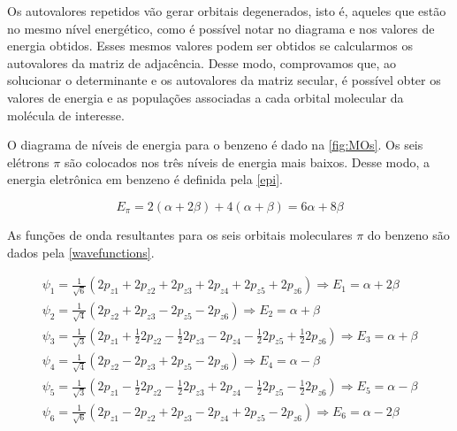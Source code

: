Os autovalores repetidos vão gerar orbitais degenerados, isto é, aqueles que estão no mesmo nível energético, como é possível notar no diagrama e nos valores de energia obtidos. Esses mesmos valores podem ser obtidos se calcularmos os autovalores da matriz de adjacência. Desse modo, comprovamos que, ao solucionar o determinante e os autovalores da matriz secular, é possível obter os valores de energia e as populações associadas a cada orbital molecular da molécula de interesse.

O diagrama de níveis de energia para o benzeno é dado na \autoref{fig:MOs}. Os seis elétrons $\pi$ são colocados nos três níveis de energia mais baixos. Desse modo, a energia eletrônica em benzeno é definida pela \autoref{epi}.

\begin{equation}
\label{epi}
    E_\pi = 2(\alpha + 2\beta) + 4(\alpha + \beta) = 6\alpha + 8\beta
\end{equation}

As funções de onda resultantes para os seis orbitais moleculares $\pi$ do benzeno são dados pela \autoref{wavefunctions}.

\begin{equation}
\label{wavefunctions}
\begin{split}
    \psi_1 = \frac{1}{\sqrt{6}}(2p_{z1} + 2p_{z2} + 2p_{z3} + 2p_{z4} + 2p_{z5} + 2p_{z6}) \Longrightarrow E_1 = \alpha + 2\beta \\
    \psi_2 = \frac{1}{\sqrt{4}}(2p_{z2} + 2p_{z3} - 2p_{z5} - 2p_{z6}) \Longrightarrow E_2 = \alpha + \beta \\
   \psi_3 = \frac{1}{\sqrt{3}}(2p_{z1} + \frac{1}{2} 2p_{z2} - \frac{1}{2} 2p_{z3} - 2p_{z4} - \frac{1}{2} 2p_{z5} + \frac{1}{2} 2p_{z6}) \Longrightarrow E_3 = \alpha + \beta \\
     \psi_4 = \frac{1}{\sqrt{4}}(2p_{z2} - 2p_{z3} + 2p_{z5} - 2p_{z6}) \Longrightarrow E_4 = \alpha - \beta \\
      \psi_5 = \frac{1}{\sqrt{3}}(2p_{z1} - \frac{1}{2} 2p_{z2} - \frac{1}{2} 2p_{z3} + 2p_{z4} - \frac{1}{2} 2p_{z5} - \frac{1}{2} 2p_{z6}) \Longrightarrow E_5 = \alpha - \beta \\
      \psi_6 = \frac{1}{\sqrt{6}}(2p_{z1} - 2p_{z2} + 2p_{z3} - 2p_{z4} +  2p_{z5} -  2p_{z6}) \Longrightarrow E_6 = \alpha - 2\beta 
\end{split}
\end{equation}


